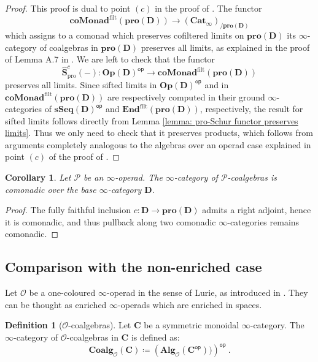 \documentclass[a4paper,12pt]{amsart}
\theoremstyle{plain}
\newtheorem{corollary}[theorem]{Corollary}%
\theoremstyle{definition}
\newtheorem{definition}[theorem]{Definition}%
\theoremstyle{remark}
\begin{document}
\begin{proof}
This proof is dual to point $(c)$ in the proof of \cite[Theorem 5.2]{heuts2024}. The functor \[
\mathbf{coMonad}^{\mathrm{filt}}(\mathbf{pro}(\mathbf{D})) \longrightarrow (\mathbf{Cat}_\infty)_{/\mathbf{pro}(\mathbf{D})}
\]which assigns to a comonad which preserves cofiltered limits on $\mathbf{pro}(\mathbf{D})$ its $\infty$-category of coalgebras in $\mathbf{pro}(\mathbf{D})$ preserves all limits, as explained in the proof of Lemma A.7 in \cite{heuts2024}. We are left to check that the functor \[
\widehat{\mathbf{S}}^c_{\mathrm{pro}}(-): \mathbf{Op}(\mathbf{D})^{\mathsf{op}} \longrightarrow \mathbf{coMonad}^{\mathrm{filt}}(\mathbf{pro}(\mathbf{D}))
\]preserves all limits. Since sifted limits in $\mathbf{Op}(\mathbf{D})^{\mathsf{op}}$ and in $\mathbf{coMonad}^{\mathrm{filt}}(\mathbf{pro}(\mathbf{D}))$ are respectively computed in their ground $\infty$-categories of $\mathbf{sSeq}(\mathbf{D})^{\mathsf{op}}$ and $\mathbf{End}^{\mathrm{filt}}(\mathbf{pro}(\mathbf{D}))$, respectively, the result for sifted limits follows directly from Lemma \ref{lemma: pro-Schur functor preserves limits}. Thus we only need to check that it preserves products, which follows from arguments completely analogous to the algebras over an operad case explained in point $(c)$ of the proof of \cite[Theorem 5.2]{heuts2024}. 
\end{proof}

\begin{corollary}
Let $\mathscr{P}$ be an $\infty$-operad. The $\infty$-category of $\mathscr{P}$-coalgebras is comonadic over the base $\infty$-category $\mathbf{D}$. 
\end{corollary}

\begin{proof}
The fully faithful inclusion $c: \mathbf{D} \longrightarrow \mathbf{pro}(\mathbf{D})$ admits a right adjoint, hence it is comonadic, and thus pullback along two comonadic $\infty$-categories remains comonadic.
\end{proof}

\subsection{Comparison with the non-enriched case}
Let $\mathscr{O}$ be a one-coloured $\infty$-operad in the sense of Lurie, as introduced in \cite[Chapter 2]{HigherAlgebra}. They can be thought as enriched $\infty$-operads which are enriched in spaces. 

\begin{definition}[$\mathscr{O}$-coalgebras]\label{Def: O-coalgebras}
Let $\mathbf{C}$ be a symmetric monoidal $\infty$-category. The $\infty$-category of $\mathscr{O}$-coalgebras in $\mathbf{C}$ is defined as:
\[
\mathbf{Coalg}_{\mathscr{O}}(\mathbf{C}) \coloneqq \left(\mathbf{Alg}_{\mathscr{O}}(\mathbf{C}^{\mathsf{op}}))\right)^{\mathsf{op}}~. 
\]
\end{definition}
\end{document}
